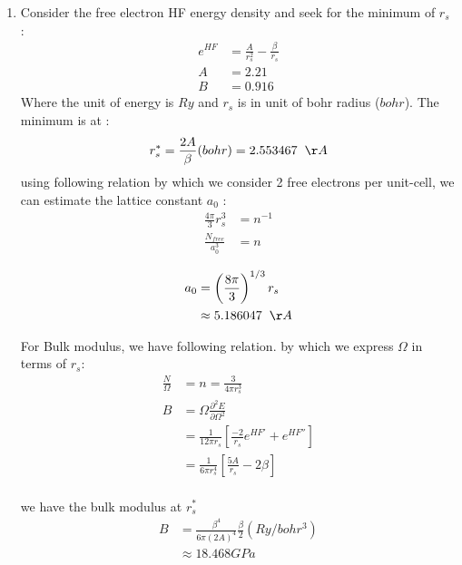 \documentclass[notitlepage]{revtex4-1}
\begin{document}
\begin{CJK}{UTF8}{bsmi}
\begin{enumerate}
\begin{itemize}
\begin{enumerate}[label=(\arabic*)]
				\item  Consider the free electron HF energy density and seek for the minimum of $r_s$ :
				\begin{align*}
				e^{HF} &= \frac{A}{r_s^2} - \frac{\beta}{r_s} \\
				A &= 2.21 \\
				B &= 0.916
				\end{align*}
				Where the unit of energy is $Ry$ and $r_s$ is in unit of bohr radius ($bohr$). The minimum is at :
				\begin{equation*}
				r_s^{*} =\frac{2A}{\beta} (bohr)=  2.553467 \hspace{0.2cm} \AA 
				\end{equation*} 
				using following relation by which we consider 2 free electrons per unit-cell, we can estimate the lattice constant $a_0$ :
				\begin{align*}
				\frac{4\pi}{3}r_s^3 &= n^{-1} \\
				\frac{N_{free}}{a_0^3} &= n 
				\end{align*}
				
				\begin{align*}
				a_0 &= \left( \frac{8\pi}{3}\right)^{1/3} r_s \\
				&\approx 5.186047 \hspace{0.2cm} \AA \\
				\end{align*}
				
				For Bulk modulus, we have following relation. by which we express $\Omega$ in terms of $r_s$:
				\begin{align*}
				\frac{N}{\Omega} &= n = \frac{3}{4\pi r_s^3} \\
				B &= \Omega \frac{\partial^{2}E}{\partial \Omega^{2}} \\
				&= \frac{1}{12\pi r_s}\left[ \frac{-2}{r_s}e^{HF'} + e^{HF''} \right] \\
				&= \frac{1}{6\pi r_s^4} \left[ \frac{5A}{r_s} - 2\beta \right] \\
				\end{align*}
				
				we have the bulk modulus at $r_s^{*}$
				\begin{align*}
				B &= \frac{\beta^4}{6\pi(2A)^4} \frac{\beta}{2} (Ry/bohr^3)\\
				&\approx 18.468 GPa
				\end{align*}
				
			\end{enumerate}	
		\end{itemize}
\end{enumerate}






	
\end{CJK}
\end{document}
